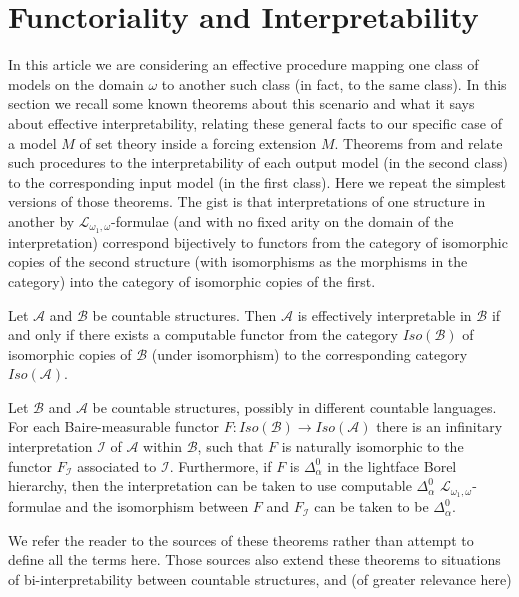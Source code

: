 \documentclass{amsart}
\begin{document}
\section{Functoriality and Interpretability}
\label{sec:functoriality}
In this article we are considering an effective procedure mapping one class of models
on the domain $\omega$ to another such class (in fact, to the same class). In this section we recall some known theorems about this scenario and what it says about effective interpretability, relating these general facts to our specific case of a model $M$ of set theory inside a forcing extension $M$.
Theorems from \cite{HTM3} and \cite{HTM2} relate such procedures
to the interpretability of each output model (in the second class) to the
corresponding input model (in the first class).
Here we repeat
the simplest versions of those theorems.
The gist is that interpretations
of one structure in another by $\mathcal{L}_{\omega_1,\omega}$-formulae
(and with no fixed arity on the domain of the interpretation) correspond bijectively
to functors from the category of isomorphic copies of the second structure
(with isomorphisms as the morphisms in the category)
into the category of isomorphic copies of the first.
\begin{theorem}
\label{thm:HTM3}
Let $\mathcal A$ and $\mathcal B$ be countable structures. Then
$\mathcal A$ is effectively interpretable in $\mathcal B$ if and only if
there exists a computable functor from the category $Iso(\mathcal B)$
of isomorphic copies of $\mathcal B$ (under isomorphism) to the
corresponding category $Iso(\mathcal A)$.
\end{theorem}
\begin{theorem}
\label{thm:HTM2}
Let $\mathcal B$ and $\mathcal A$ be countable structures, possibly in different countable languages.
For each Baire-measurable functor $F:Iso(\mathcal B)\to Iso(\mathcal A)$ there is an
infinitary interpretation $\mathcal I$ of $\mathcal A$ within $\mathcal B$, such that $F$ is naturally isomorphic
to the functor $F_{\mathcal I}$ associated to $\mathcal I$.
Furthermore, if $F$ is $\Delta^0_{\alpha}$
in the lightface Borel hierarchy, then the interpretation can be taken to use
computable $\Delta^0_\alpha$ $\mathcal{L}_{\omega_1,\omega}$-formulae and the isomorphism
between $F$ and $F_{\mathcal I}$ can be taken to be $\Delta^0_\alpha$.
\end{theorem}
We refer the reader to the sources of these theorems rather than attempt
to define all the terms here.
Those sources also extend these theorems
to situations of bi-interpretability between countable structures, and (of greater relevance here)
\end{document}
